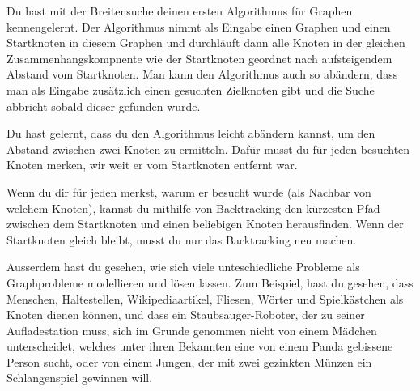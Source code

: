 Du hast mit der Breitensuche deinen ersten Algorithmus für Graphen kennengelernt. Der Algorithmus nimmt als Eingabe einen Graphen und einen Startknoten in diesem Graphen und durchläuft dann alle Knoten in der gleichen Zusammenhangskompnente wie der Startknoten geordnet nach aufsteigendem Abstand vom Startknoten. Man kann den Algorithmus auch so abändern, dass man als Eingabe zusätzlich einen gesuchten Zielknoten gibt und die Suche abbricht sobald dieser gefunden wurde.

Du hast gelernt, dass du den Algorithmus leicht abändern kannst, um den Abstand zwischen zwei Knoten zu ermitteln. Dafür musst du für jeden besuchten Knoten merken, wir weit er vom Startknoten entfernt war.

Wenn du dir für jeden merkst, warum er besucht wurde (als Nachbar von welchem Knoten), kannst du mithilfe von Backtracking den kürzesten Pfad zwischen dem Startknoten und einen beliebigen Knoten herausfinden. Wenn der Startknoten gleich bleibt, musst du nur das Backtracking neu machen.

Ausserdem hast du gesehen, wie sich viele unteschiedliche Probleme als Graphprobleme modellieren und lösen lassen. Zum Beispiel, hast du gesehen, dass Menschen, Haltestellen, Wikipediaartikel, Fliesen, Wörter und Spielkästchen als Knoten dienen können, und dass ein Staubsauger-Roboter, der zu seiner Aufladestation muss, sich im Grunde genommen nicht von einem Mädchen unterscheidet, welches unter ihren Bekannten eine von einem Panda gebissene Person sucht, oder von einem Jungen, der mit zwei gezinkten Münzen ein Schlangenspiel gewinnen will.
